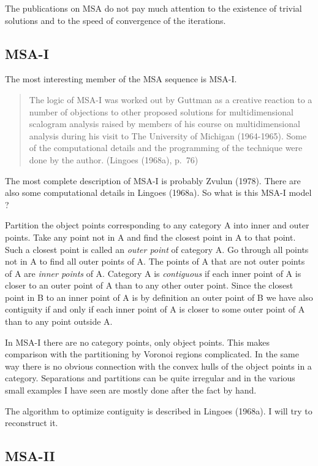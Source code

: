 \documentclass[
  12pt,
]{article}
\begin{document}
The publications on MSA do not pay much attention to the existence
of trivial solutions and to the speed of convergence of the
iterations.

\subsection{MSA-I}\label{msa-i}

The most interesting member of the MSA sequence is MSA-I.

\begin{quote}
The logic of MSA-I was worked out by Guttman as a creative reaction to a number of objections to other proposed solutions for multidimensional scalogram analysis raised by members of his course on multidimensional analysis during his visit to The University of Michigan (1964-1965).
Some of the computational details and the programming of the technique were done by the author. (Lingoes (1968a), p.~76)
\end{quote}

The most complete description of MSA-I is probably Zvulun (1978). There
are also some computational details in Lingoes (1968a). So what is this
MSA-I model ?

Partition the object points corresponding to any category A into inner and outer points. Take any point not in A and find the closest point in A to that point. Such a closest point is called an \emph{outer point} of category A. Go through all points not in A to find all outer points of A. The points of A that are not outer points of A are \emph{inner points} of A.
Category A is \emph{contiguous} if each inner point of A is closer to an outer point of A than to any other outer point. Since the closest point in B to an inner point of A is by definition an outer point of B we have also contiguity if and only if each inner point of A is closer to some outer point of A than to any point outside A.

In MSA-I there are no category points, only object points. This makes
comparison with the partitioning by Voronoi regions complicated. In
the same way there is no obvious connection with the convex hulls of
the object points in a category. Separations and partitions can be quite
irregular and in the various small examples I have seen are mostly
done after the fact by hand.

The algorithm to optimize contiguity is described in Lingoes (1968a). I will
try to reconstruct it.

\subsection{MSA-II}\label{msa-ii}
\end{document}
